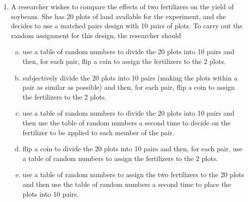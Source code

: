 \documentclass[a4paper,12pt,twoside]{book}
\begin{document}
\begin{enumerate}
   \item  A researcher wishes to compare the effects of two fertilizers on the yield of soybeans. She has 20 plots of land available for the experiment, and she decides to use a matched pairs design with 10 pairs of plots. To carry out the random assignment for this design, the researcher should
     \begin{enumerate}[(a)]
         \item  use a table of random numbers to divide the 20 plots into 10 pairs and then, for each pair, flip a coin to assign the fertilizers to the 2 plots.
         \item  subjectively divide the 20 plots into 10 pairs (making the plots within a pair as similar as possible) and then, for each pair, flip a coin to assign the fertilizers to the 2 plots.
         \item  use a table of random numbers to divide the 20 plots into 10 pairs and then use the table of random numbers a second time to decide on the fertilizer to be applied to each member of the pair.
         \item  flip a coin to divide the 20 plots into 10 pairs and then, for each pair, use a table of random numbers to assign the fertilizers to the 2 plots.
         \item use a table of random numbers to assign the two fertilizers to the 20 plots and then use the table of random numbers a second time to place the plots into 10 pairs.
     \end{enumerate}               
             

\end{enumerate}
\end{document}
